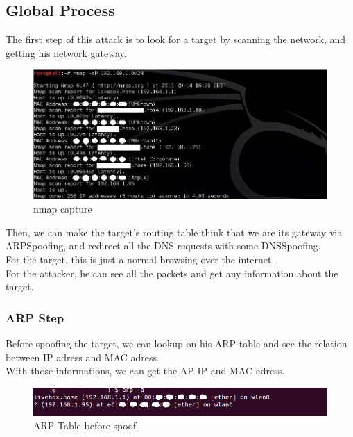 \documentclass[a4paper, 11pt, oneside]{article}
\begin{document}
\subsection{Global Process}
The first step of this attack is to look for a target by scanning the network, and getting his network gateway. \\
\begin{figure}[!h]
	\centering
	\includegraphics[scale=0.75]{../images/captureNMAP.jpg}
	\caption{nmap capture} %
	\label{nmap_capture} %
\end{figure}
Then, we can make the target's routing table think that we are its gateway via ARPSpoofing, and redirect all the DNS requests with some DNSSpoofing.\\
For the target, this is just a normal browsing over the internet.\\
For the attacker, he can see all the packets and get any information about the target.\\


\subsubsection{ARP Step}
Before spoofing the target, we can lookup on his ARP table and see the relation between IP adress and MAC adress. \\
With those informations, we can get the AP IP and MAC adress. \\
\begin{figure}[!h]
	\centering
	\includegraphics[scale=0.75]{../images/arpTableBeforeSpoof.png}
	\caption{ARP Table before spoof}
	\label{ARP_before_spoof}
\end{figure}
\end{document}
